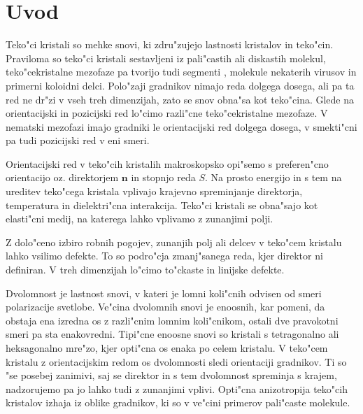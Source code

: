\documentclass[a4paper,10pt]{article}
\begin{document}
\newpage
\tableofcontents

\newpage
\section{Uvod} %

Teko"ci kristali so mehke snovi, ki zdru"zujejo lastnosti kristalov in teko"cin\cite{degennes}. 
Praviloma so teko"ci kristali sestavljeni iz pali"castih ali diskastih molekul, teko"cekristalne mezofaze pa tvorijo tudi segmenti , molekule nekaterih virusov in primerni koloidni delci. 
Polo"zaji gradnikov nimajo reda dolgega dosega, ali pa ta red ne dr"zi v vseh treh dimenzijah, zato se snov obna"sa kot teko"cina. 
Glede na orientacijski in pozicijski red lo"cimo razli"cne teko"cekristalne mezofaze. 
V nematski mezofazi imajo gradniki le orientacijski red dolgega dosega, v smekti"cni pa tudi pozicijski red v eni smeri. 

Orientacijski red v teko"cih kristalih makroskopsko opi"semo s preferen"cno orientacijo oz. direktorjem $\mathbf{n}$ in stopnjo reda $S$. 
Na prosto energijo in s tem na ureditev teko"cega kristala vplivajo krajevno spreminjanje direktorja, temperatura in dielektri"cna interakcija. 
Teko"ci kristali se obna"sajo kot elasti"cni medij, na katerega lahko vplivamo z zunanjimi polji. 

Z dolo"ceno izbiro robnih pogojev, zunanjih polj ali delcev v teko"cem kristalu lahko vsilimo defekte. 
To so podro"cja zmanj"sanega reda, kjer direktor ni definiran. 
V treh dimenzijah lo"cimo to"ckaste in linijske defekte. 


Dvolomnost je lastnost snovi, v kateri je lomni koli"cnih odvisen od smeri polarizacije svetlobe\cite{dvolomnost}. 
Ve"cina dvolomnih snovi je enoosnih, kar pomeni, da obstaja ena izredna os z razli"cnim lomnim koli"cnikom, ostali dve pravokotni smeri pa sta enakovredni. 
Tipi"cne enoosne snovi so kristali s tetragonalno ali heksagonalno mre"zo, kjer opti"cna os enaka po celem kristalu. 
V teko"cem kristalu z orientacijskim redom os dvolomnosti sledi orientaciji gradnikov. 
Ti so "se posebej zanimivi, saj se direktor in s tem dvolomnost spreminja s krajem, nadzorujemo pa jo lahko tudi z zunanjimi vplivi. 
Opti"cna anizotropija teko"cih kristalov izhaja iz oblike gradnikov, ki so v ve"cini primerov pali"caste molekule. 
\end{document}
